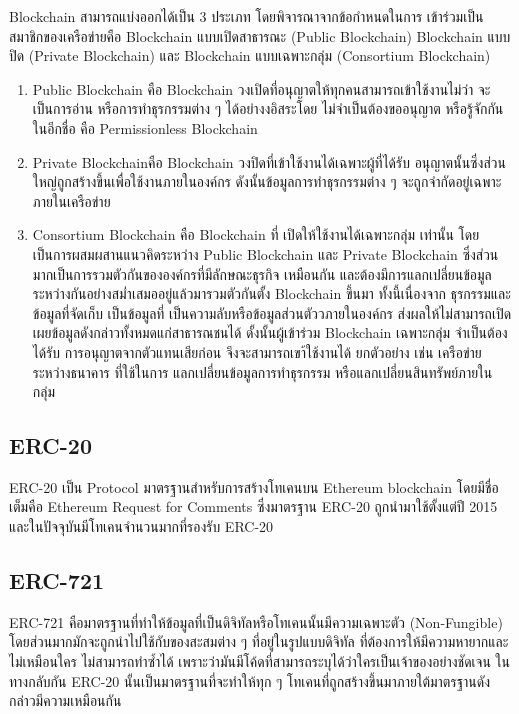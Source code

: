 \documentclass[12pt,oneside,openright,a4paper]{cpe-thai-project}
\begin{document}
\tab Blockchain สามารถแบ่งออกได้เป็น 3 ประเภท โดยพิจารณาจากข้อกำหนดในการ เข้าร่วมเป็นสมาชิกของเครือข่ายคือ Blockchain แบบเปิดสาธารณะ (Public Blockchain) Blockchain แบบปิด (Private Blockchain) และ Blockchain แบบเฉพาะกลุ่ม (Consortium Blockchain) 
\begin{enumerate}[label=\thesubsection.\arabic*,leftmargin=0pt,itemindent=2cm]
\item Public Blockchain คือ Blockchain วงเปิดที่อนุญาตให้ทุกคนสามารถเข้าใช้งานไม่ว่า จะเป็นการอ่าน หรือการทำธุรกรรมต่าง ๆ ได้อย่างงอิสระโดย ไม่จำเป็นต้องขออนุญาต หรือรู้จักกันในอีกชื่อ คือ Permissionless Blockchain
\item Private Blockchainคือ Blockchain วงปิดที่เข้าใช้งานได้เฉพาะผู้ที่ได้รับ อนุญาตนั้นซึ่งส่วนใหญ่ถูกสร้างขึ้นเพื่อใช้งานภายในองค์กร ดังนั้นข้อมูลการทำธุรกรรมต่าง ๆ จะถูกจํากัดอยู่เฉพาะภายในเครือข่าย
\item Consortium Blockchain คือ Blockchain ที่ เปิดให้ใช้งานได้เฉพาะกลุ่ม เท่านั้น โดยเป็นการผสมผสานแนวคิดระหว่าง Public Blockchain และ Private Blockchain ซึ่งส่วนมากเป็นการรวมตัวกันขององค์กรที่มีลักษณะธุรกิจ เหมือนกัน และต้องมีการแลกเปลี่ยนข้อมูลระหว่างกันอย่างสม่ำเสมออยู่แล้วมารวมตัวกันตั้ง Blockchain ขึ้นมา ทั้งนี้เนื่องจาก ธุรกรรมและข้อมูลที่จัดเก็บ เป็นข้อมูลที่ เป็นความลับหรือข้อมูลส่วนตัววภายในองค์กร ส่งผลให้ไม่สามารถเปิดเผยข้อมูลดังกล่าวทั้งหมดแก่สาธารณชนได้ ดั้งนั้นผู้เข้าร่วม Blockchain เฉพาะกลุ่ม จำเป็นต้องได้รับ การอนุญาตจากตัวแทนเสียก่อน จึงจะสามารถเขา้ใช้งานได้ ยกตัวอย่าง เช่น เครือข่ายระหว่างธนาคาร ที่ใช้ในการ แลกเปลี่ยนข้อมูลการทำธุรกรรม หรือแลกเปลี่ยนสินทรัพย์ภายในกลุ่ม
\end{enumerate}

\subsection{ERC-20 \cite{erc20}}
\tab ERC-20 เป็น Protocol มาตรฐานสําหรับการสร้างโทเคนบน Ethereum blockchain โดยมีชื่อเต็มคือ Ethereum Request for Comments ซึ่งมาตรฐาน ERC-20 ถูกนํามาใช้ตั้งแต่ปี 2015 และในปัจจุบันมีโทเคนจํานวนมากที่รองรับ ERC-20

\subsection{ERC-721  \cite{erc721}}
\tab ERC-721 คือมาตรฐานที่ทำให้ข้อมูลที่เป็นดิจิทัลหรือโทเคนนั้นมีความเฉพาะตัว (Non-Fungible) โดยส่วนมากมักจะถูกนำไปใช้กับของสะสมต่าง ๆ ที่อยู่ในรูปแบบดิจิทัล ที่ต้องการให้มีความหายากและไม่เหมือนใคร ไม่สามารถทำซ้ำได้ เพราะว่ามันมีโค้ดที่สามารถระบุได้ว่าใครเป็นเจ้าของอย่างชัดเจน ในทางกลับกัน ERC-20 นั้นเป็นมาตรฐานที่จะทำให้ทุก ๆ โทเคนที่ถูกสร้างขึ้นมาภายใต้มาตรฐานดังกล่าวมีความเหมือนกัน
\end{document}

